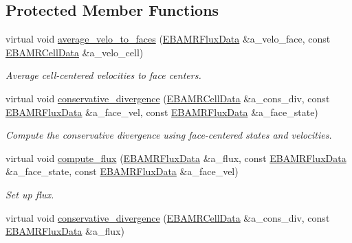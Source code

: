 \subsection*{Protected Member Functions}
\begin{DoxyCompactItemize}
\item 
virtual void \hyperlink{classcdr__solver_a828d7a5327703f7217786bbc8616f0d7}{average\+\_\+velo\+\_\+to\+\_\+faces} (\hyperlink{type__definitions_8H_aadad278b2e5d3d4abcf9032f90ba78c3}{E\+B\+A\+M\+R\+Flux\+Data} \&a\+\_\+velo\+\_\+face, const \hyperlink{type__definitions_8H_a7e610f301989e5e07781c5e338bdb7c3}{E\+B\+A\+M\+R\+Cell\+Data} \&a\+\_\+velo\+\_\+cell)
\begin{DoxyCompactList}\small\item\em Average cell-\/centered velocities to face centers. \end{DoxyCompactList}\item 
virtual void \hyperlink{classcdr__solver_a492a658ee37fb6421d15f8cc99c337bb}{conservative\+\_\+divergence} (\hyperlink{type__definitions_8H_a7e610f301989e5e07781c5e338bdb7c3}{E\+B\+A\+M\+R\+Cell\+Data} \&a\+\_\+cons\+\_\+div, const \hyperlink{type__definitions_8H_aadad278b2e5d3d4abcf9032f90ba78c3}{E\+B\+A\+M\+R\+Flux\+Data} \&a\+\_\+face\+\_\+vel, const \hyperlink{type__definitions_8H_aadad278b2e5d3d4abcf9032f90ba78c3}{E\+B\+A\+M\+R\+Flux\+Data} \&a\+\_\+face\+\_\+state)
\begin{DoxyCompactList}\small\item\em Compute the conservative divergence using face-\/centered states and velocities. \end{DoxyCompactList}\item 
virtual void \hyperlink{classcdr__solver_a0332e4ba38455b32da1c54f8cb2b3be2}{compute\+\_\+flux} (\hyperlink{type__definitions_8H_aadad278b2e5d3d4abcf9032f90ba78c3}{E\+B\+A\+M\+R\+Flux\+Data} \&a\+\_\+flux, const \hyperlink{type__definitions_8H_aadad278b2e5d3d4abcf9032f90ba78c3}{E\+B\+A\+M\+R\+Flux\+Data} \&a\+\_\+face\+\_\+state, const \hyperlink{type__definitions_8H_aadad278b2e5d3d4abcf9032f90ba78c3}{E\+B\+A\+M\+R\+Flux\+Data} \&a\+\_\+face\+\_\+vel)
\begin{DoxyCompactList}\small\item\em Set up flux. \end{DoxyCompactList}\item 
virtual void \hyperlink{classcdr__solver_a24976069ef332e97c9faf87dbae9c0c0}{conservative\+\_\+divergence} (\hyperlink{type__definitions_8H_a7e610f301989e5e07781c5e338bdb7c3}{E\+B\+A\+M\+R\+Cell\+Data} \&a\+\_\+cons\+\_\+div, const \hyperlink{type__definitions_8H_aadad278b2e5d3d4abcf9032f90ba78c3}{E\+B\+A\+M\+R\+Flux\+Data} \&a\+\_\+flux)

\end{DoxyCompactItemize}
